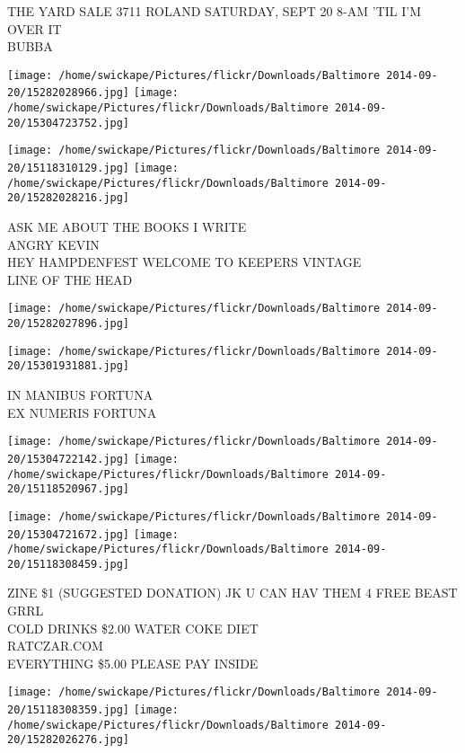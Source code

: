 \documentclass[10pt,letterpaper]{article}
\begin{document}
THE YARD SALE 3711 ROLAND SATURDAY, SEPT 20 8{-}AM 'TIL I'M OVER IT\\
BUBBA
\pagebreak

\texttt{[image: /home/swickape/Pictures/flickr/Downloads/Baltimore 2014-09-20/15282028966.jpg]}
\texttt{[image: /home/swickape/Pictures/flickr/Downloads/Baltimore 2014-09-20/15304723752.jpg]}

\texttt{[image: /home/swickape/Pictures/flickr/Downloads/Baltimore 2014-09-20/15118310129.jpg]}
\texttt{[image: /home/swickape/Pictures/flickr/Downloads/Baltimore 2014-09-20/15282028216.jpg]}

ASK ME ABOUT THE BOOKS I WRITE\\
ANGRY KEVIN\\
HEY HAMPDENFEST WELCOME TO KEEPERS VINTAGE\\
LINE OF THE HEAD
\pagebreak

\texttt{[image: /home/swickape/Pictures/flickr/Downloads/Baltimore 2014-09-20/15282027896.jpg]}

\vspace{0.25in}
\texttt{[image: /home/swickape/Pictures/flickr/Downloads/Baltimore 2014-09-20/15301931881.jpg]}

IN MANIBUS FORTUNA\\
EX NUMERIS FORTUNA
\pagebreak

\texttt{[image: /home/swickape/Pictures/flickr/Downloads/Baltimore 2014-09-20/15304722142.jpg]}
\texttt{[image: /home/swickape/Pictures/flickr/Downloads/Baltimore 2014-09-20/15118520967.jpg]}

\texttt{[image: /home/swickape/Pictures/flickr/Downloads/Baltimore 2014-09-20/15304721672.jpg]}
\texttt{[image: /home/swickape/Pictures/flickr/Downloads/Baltimore 2014-09-20/15118308459.jpg]}

ZINE \$1 (SUGGESTED DONATION) JK U CAN HAV THEM 4 FREE BEAST GRRL\\
COLD DRINKS \$2.00 WATER COKE DIET\\
RATCZAR.COM\\
EVERYTHING \$5.00 PLEASE PAY INSIDE
\pagebreak

\texttt{[image: /home/swickape/Pictures/flickr/Downloads/Baltimore 2014-09-20/15118308359.jpg]}
\texttt{[image: /home/swickape/Pictures/flickr/Downloads/Baltimore 2014-09-20/15282026276.jpg]}
\end{document}
